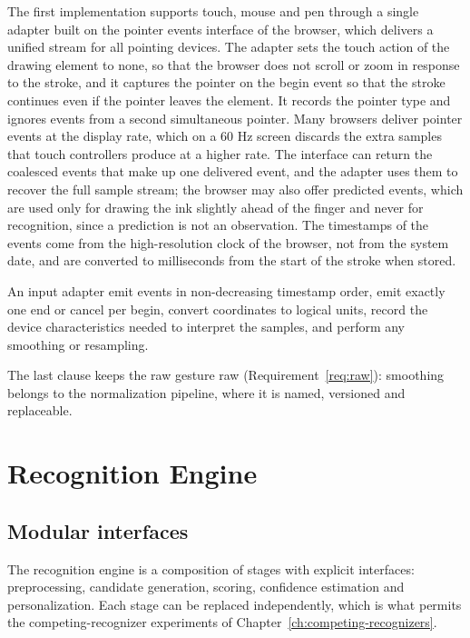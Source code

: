 The first implementation supports touch, mouse and pen through a single adapter built on the pointer events interface of the browser, which delivers a unified stream for all pointing devices.\evD{} The adapter sets the touch action of the drawing element to none, so that the browser does not scroll or zoom in response to the stroke, and it captures the pointer on the begin event so that the stroke continues even if the pointer leaves the element. It records the pointer type and ignores events from a second simultaneous pointer. Many browsers deliver pointer events at the display rate, which on a 60 Hz screen discards the extra samples that touch controllers produce at a higher rate. The interface can return the coalesced events that make up one delivered event, and the adapter uses them to recover the full sample stream; the browser may also offer predicted events, which are used only for drawing the ink slightly ahead of the finger and never for recognition, since a prediction is not an observation.\evD{} The timestamps of the events come from the high-resolution clock of the browser, not from the system date, and are converted to milliseconds from the start of the stroke when stored.

\begin{requirement}\label{req:adapter}
An input adapter \must{} emit events in non-decreasing timestamp order, \must{} emit exactly one end or cancel per begin, \must{} convert coordinates to logical units, \must{} record the device characteristics needed to interpret the samples, and \mustnot{} perform any smoothing or resampling.\evS
\end{requirement}

The last clause keeps the raw gesture raw (Requirement~\ref{req:raw}): smoothing belongs to the normalization pipeline, where it is named, versioned and replaceable.

\chapter{Recognition Engine}\label{ch:recognition-engine}

\section{Modular interfaces}

The recognition engine is a composition of stages with explicit interfaces: preprocessing, candidate generation, scoring, confidence estimation and personalization. Each stage can be replaced independently, which is what permits the competing-recognizer experiments of Chapter~\ref{ch:competing-recognizers}.

